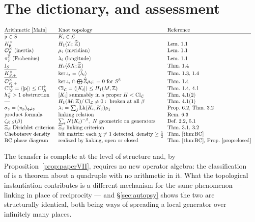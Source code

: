 \documentclass[11pt]{amsart}
\numberwithin{equation}{section}
\theoremstyle{definition}
\theoremstyle{remark}
\newcommand{\Z}{\mathbb{Z}}
\newcommand{\hZ}{\widehat{\Z}}
\newcommand{\cL}{\mathcal{L}}
\newcommand{\cO}{\mathcal{O}}
\newcommand{\Idl}{\mathbb{I}}
\newcommand{\pp}{\mathfrak{p}}
\newcommand{\qq}{\mathfrak{q}}
\newcommand{\Cl}{\operatorname{Cl}}
\newcommand{\Lk}{\operatorname{Lk}}
\newcommand{\tlam}{\widetilde\lambda}
\begin{document}
\section{The dictionary, and assessment}\label{sec:dict}

\[
\begin{array}{@{}l@{\ \ }l@{\ \ }l@{}}
\text{Arithmetic \cite{Main}} & \text{Knot topology} & \text{Reference}\\\hline
\pp\in S & K_i\in\cL & \text{---}\\
K_\pp^\times & H_1(T_i;\hZ) & \text{Lem.~1.1}\\
\cO_\pp^\times\ (\text{inertia}) & \mu_i\ (\text{meridian}) & \text{Lem.~1.1}\\
\pi_\pp^{\hZ}\ (\text{Frobenius}) & \lambda_i\ (\text{longitude}) & \text{Lem.~1.1}\\
\Idl_S & H_1(\partial X;\hZ) & \text{Thm.~1.4}\\
\overline{K^\times_{S,+}} & \ker\iota_*=\langle\tlam_i\rangle & \text{Thm.~1.3, 1.4}\\
\overline{\cO^\times_{K,+}} & \ker\iota_*\cap\bigoplus\hZ\mu_i;\ =0\text{ for }S^3 & \text{Thm.~1.4}\\
\Cl^+_S=\langle[\pp]\rangle\le\Cl^+_K & \Cl_\cL=\langle[K_i]\rangle\le H_1(M;\Z) & \text{Thm.~1.4, 4.1}\\
h^+_S>1\ \text{obstruction} & [K_i]\text{ summably in a proper }H<\Cl_\cL & \text{Thm.~4.1(2)}\\
\text{---} & H_1(M;\Z)/\Cl_\cL\ne0:\ \text{broken at all }\beta & \text{Thm.~4.1(1)}\\
\sigma_\pp=(\pi_\pp)_{\qq\ne\pp} & \lambda_i=\sum_j\Lk(K_i,K_j)\mu_j & \text{Prop.~6.2, Thm.~3.2}\\
\text{product formula} & \text{linking relation} & \text{Rem.~6.3}\\
\zeta_{K,S}(\beta) & \sum_iN(K_i)^{-\beta},\ N\text{ geometric on generators} & \text{Def.~2.2, 5.1}\\
\Xi_\beta\ \text{Dirichlet criterion} & \Xi_\beta\ \text{linking criterion} & \text{Thm.~3.1, 3.2}\\
\text{Chebotarev density} & \text{bit matrix: each }\chi\ne1\text{ detected, density}\ge\tfrac12 & \text{Thm.~\ref{thm:BC}}\\
\text{BC phase diagram} & \text{realized by linking, open or closed} & \text{Thm.~\ref{thm:BC}, Prop.~\ref{prop:closed}}
\end{array}
\]

The transfer is complete at the level of structure and, by Proposition~\ref{prop:paperVII},
requires no new operator algebra: the classification of \cite{Main} is a theorem about a
quadruple with no arithmetic in it. What the topological instantiation contributes is a
different mechanism for the same phenomenon --- linking in place of reciprocity --- and
\S\ref{sec:autopsy} shows the two are structurally identical, both being ways of spreading a
local generator over infinitely many places.
\end{document}
